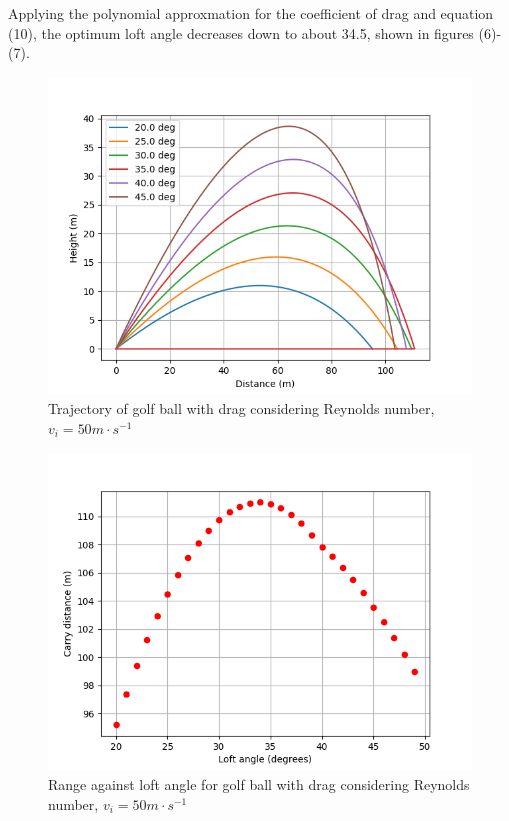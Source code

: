 \documentclass[12pt]{article}
\begin{document}
Applying the polynomial approxmation for the coefficient of drag and equation (10), the optimum loft angle decreases down to about 34.5\degree, shown in figures (6)-(7).
\begin{figure}[H]
\centering
\caption{Trajectory of golf ball with drag considering Reynolds number, $v_i=50 m\cdot s^{-1}$}
\includegraphics[scale=0.65]{dragwithreynolds}
\end{figure}

\begin{figure}[H]
\centering
\caption{Range against loft angle for golf ball with drag considering Reynolds number, $v_i=50 m\cdot s^{-1}$}
\includegraphics[scale=0.7]{dragwithreynoldsrange}
\end{figure}
\end{document}
